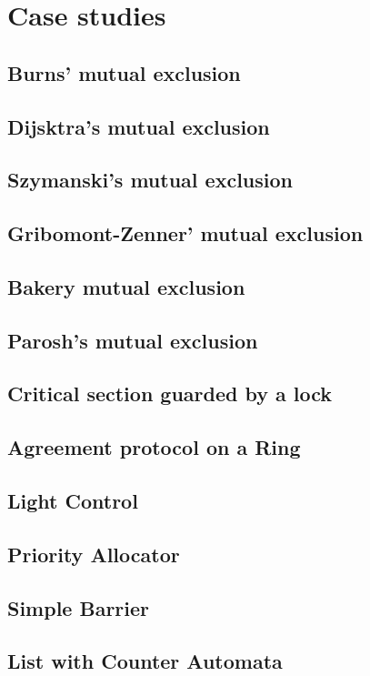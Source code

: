 \section{Case studies}
\label{appendix:experiments}
%
%
\subsection{Burns' mutual exclusion}


\subsection{Dijsktra's mutual exclusion}


\subsection{Szymanski's mutual exclusion}
%


\subsection{Gribomont-Zenner' mutual exclusion}


\subsection{Bakery mutual exclusion}


\subsection{Parosh's mutual exclusion}


\subsection{Critical section guarded by a lock}


\subsection{Agreement protocol on a Ring}


\subsection{Light Control}


\subsection{Priority Allocator}


\subsection{Simple Barrier}


\subsection{List with Counter Automata}

